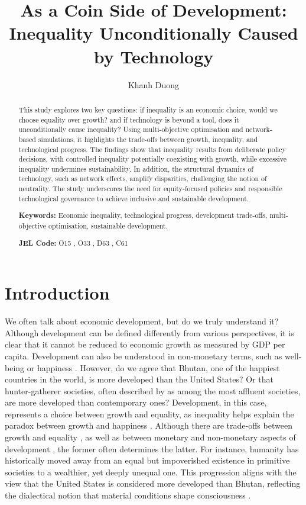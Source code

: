 \documentclass[12pt]{article}
\title{As a Coin Side of Development:\\ Inequality Unconditionally Caused by Technology}
\author[1,+]{Khanh Duong}
\affil[1]{\small UNU-MERIT, Maastricht, The Netherlands}
\affil[+]{\small Corresponding author: duong@merit.unu.edu}
\date{} %
\begin{document}
\maketitle

\begin{abstract}
\noindent This study explores two key questions: if inequality is an economic choice, would we choose equality over growth? and if technology is beyond a tool, does it unconditionally cause inequality? Using multi-objective optimisation and network-based simulations, it highlights the trade-offs between growth, inequality, and technological progress. The findings show that inequality results from deliberate policy decisions, with controlled inequality potentially coexisting with growth, while excessive inequality undermines sustainability. In addition, the structural dynamics of technology, such as network effects, amplify disparities, challenging the notion of neutrality. The study underscores the need for equity-focused policies and responsible technological governance to achieve inclusive and sustainable development.

\medskip
\textbf{Keywords:} Economic inequality, technological progress, development trade-offs, multi-objective optimisation, sustainable development.

\textbf{JEL Code:} O15  , O33  , D63  , C61  
\end{abstract}
\newpage

\section{Introduction}

We often talk about economic development, but do we truly understand it? Although development can be defined differently from various perspectives, it is clear that it cannot be reduced to economic growth as measured by GDP per capita. Development can also be understood in non-monetary terms, such as well-being or happiness \parencite{agrawal2024economic}. However, do we agree that Bhutan, one of the happiest countries in the world, is more developed than the United States? Or that hunter-gatherer societies, often described by \textcite{sahlins2013original} as among the most affluent societies, are more developed than contemporary ones? Development, in this case, represents a choice between growth and equality, as inequality helps explain the paradox between growth and happiness \parencite{oishi2015income}. Although there are trade-offs between growth and equality \parencite{okun2010equality}, as well as between monetary and non-monetary aspects of development \parencite{kahneman2010high}, the former often determines the latter. For instance, humanity has historically moved away from an equal but impoverished existence in primitive societies to a wealthier, yet deeply unequal one. This progression aligns with the view that the United States is considered more developed than Bhutan, reflecting the dialectical notion that material conditions shape consciousness \parencite{lefebvre2009dialectical}.
\end{document}
